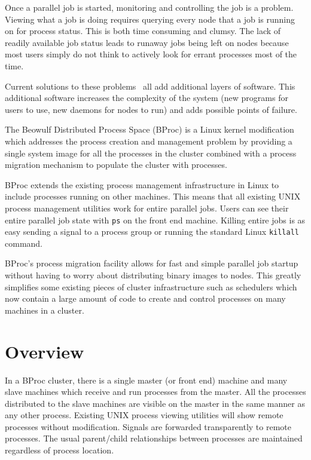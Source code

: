 Once a parallel job is started, monitoring and controlling the job is
a problem.  Viewing what a job is doing requires querying every node
that a job is running on for process status.  This is both time
consuming and clumsy.  The lack of readily available job status leads
to runaway jobs being left on nodes because most users simply do not
think to actively look for errant processes most of the time.

Current solutions to these problems~\cite{oscar,rocks} all add
additional layers of software.  This additional software increases the
complexity of the system (new programs for users to use, new daemons
for nodes to run) and adds possible points of failure.

The Beowulf Distributed Process Space (BProc) is a Linux kernel
modification which addresses the process creation and management
problem by providing a single system image for all the processes in
the cluster combined with a process migration mechanism to populate
the cluster with processes.

BProc extends the existing process management infrastructure in Linux
to include processes running on other machines.  This means that all
existing UNIX process management utilities work for entire parallel
jobs.  Users can see their entire parallel job state with \texttt{ps}
on the front end machine.  Killing entire jobs is as easy sending a
signal to a process group or running the standard Linux
\texttt{killall} command.

BProc's process migration facility allows for fast and simple parallel
job startup without having to worry about distributing binary images
to nodes.  This greatly simplifies some existing pieces of cluster
infrastructure such as schedulers which now contain a large amount of
code to create and control processes on many machines in a cluster.

\section{Overview}

In a BProc cluster, there is a single master (or front end) machine
and many slave machines which receive and run processes from the
master.  All the processes distributed to the slave machines are
visible on the master in the same manner as any other process.
Existing UNIX process viewing utilities will show remote processes
without modification.  Signals are forwarded transparently to remote
processes.  The usual parent/child relationships between processes are
maintained regardless of process location.

